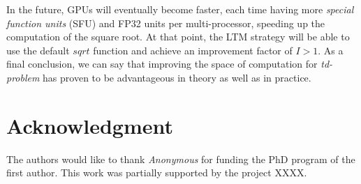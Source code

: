 \documentclass[conference]{IEEEtran}
\begin{document}
In the future, GPUs will eventually become faster, each time having more 
\textit{special function units} (SFU) and FP32 units per multi-processor, speeding up the computation of the square root. 
At that point, the LTM strategy will be able to use the default $sqrt$ function and achieve an improvement factor of $I > 1$. 
As a final conclusion, we can say that improving the space of computation for \textit{td-problem} has proven to be advantageous in theory as well as in practice.


\section*{Acknowledgment}
The authors would like to thank \textit{Anonymous} for funding the PhD program of the first author. 
This work was partially supported by the project XXXX. 











\end{document}
